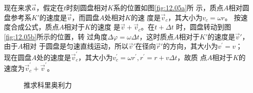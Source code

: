 现在来求$\vec{a}$，假定在$ t $时刻圆盘相对$ K $系的位置如图\ref{fig:12.05a}所
示，质点$ A $相对圆盘参考系$ K' $的速度是$\vec{v}$，而圆盘$ A $处相对$ K $的速
度是$\vec{v}_c$，其大小为$ v _ { c } = \omega r $。
按速度合成公式，质点$ A $相对于$ K $的速度
是$ \vec{v}+\vec{v}_c $。在$ t + \Delta t $ 时，圆盘转动到图\ref{fig:12.05b}所示的位置，转
过角度$ \Delta \varphi = \omega \Delta t $，这时质点$ A $相对于$ K' $的速度是$ \vec{v}' $，由于$ A $相对
于圆盘是匀速直线运动，所以$ \vec{v} ' $在径向$\vec{r}'$的方向，其大小为$ v ^ { \prime } = v $；
现在圆盘$ A $处的速度是$ \vec{v} _ c ^ \prime $，其大小为$ v _ c ^ { \prime } = \omega r ^ { \prime } , r ^ { \prime } = r + v \Delta t $，故质
点$ A $相对于$ K $的速度为$ \vec{v} _ c ^ \prime + \vec{v} ^ \prime $。\vspace{-0.5em}
\begin{figure}[h]
  \centering
  \qquad
  \qquad
  \caption{推求科里奥利力}
  \label{fig:12.05}
\end{figure}

